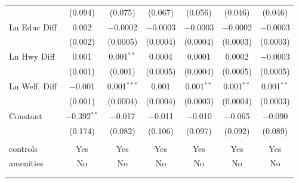 \begin{table}[!htbp]
\begin{tabular}{@{\extracolsep{5pt}}lcccccc}
  & (0.094) & (0.075) & (0.067) & (0.056) & (0.046) & (0.046) \\ 
  Ln Educ Diff & 0.002 & $-$0.0002 & $-$0.0003 & $-$0.0003 & $-$0.0002 & $-$0.0003 \\ 
  & (0.002) & (0.0005) & (0.0004) & (0.0004) & (0.0003) & (0.0003) \\ 
  Ln Hwy Diff & 0.001 & 0.001$^{**}$ & 0.0004 & 0.0001 & 0.0002 & $-$0.0003 \\ 
  & (0.001) & (0.001) & (0.0005) & (0.0004) & (0.0005) & (0.0005) \\ 
  Ln Welf. Diff & $-$0.001 & 0.001$^{***}$ & 0.001 & 0.001$^{**}$ & 0.001$^{**}$ & 0.001$^{**}$ \\ 
  & (0.001) & (0.0004) & (0.0004) & (0.0003) & (0.0004) & (0.0003) \\ 
  Constant & $-$0.392$^{**}$ & $-$0.017 & $-$0.011 & $-$0.010 & $-$0.065 & $-$0.090 \\ 
  & (0.174) & (0.082) & (0.106) & (0.097) & (0.092) & (0.089) \\ 
 \hline \\[-1.8ex] 
controls & Yes & Yes & Yes & Yes & Yes & Yes \\ 
amenities & No & No & No & No & No & No \\ 
\hline \\[-1.8ex] 
\hline 
\hline \\[-1.8ex] 
\end{tabular} 
\end{table} 

